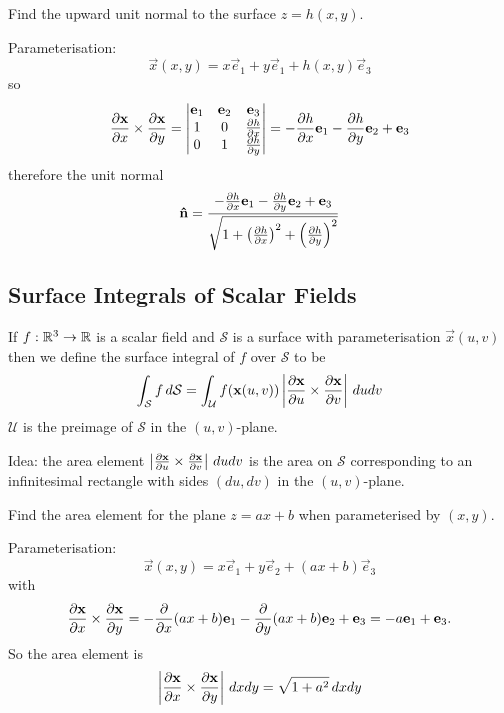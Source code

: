 \documentclass[10pt, a4paper]{article}
\begin{document}
\begin{example}
    Find the upward unit normal to the surface $z = h(x, y)$.

    \begin{solution}
        Parameterisation:
        \[
        \vec{x}(x, y) = x\vec{e}_1 + y\vec{e}_1 + h(x, y)\vec{e}_3
        \]
        so
        \[
        \pd[\vec{x}]{x} \times \pd[\vec{x}]{y} = \begin{vmatrix}
            \vec{e}_1 & \vec{e}_2 & \vec{e}_3 \\
            1 & 0 & \pd[h]{x} \\
            0 & 1 & \pd[h]{y}
        \end{vmatrix} = -\pd[h]{x}\vec{e}_1 - \pd[h]{y}\vec{e}_2 + \vec{e}_3
        \]
        therefore the unit normal
        \[
        \hvec{n} = \frac{-\pd[h]{x}\vec{e}_1 - \pd[h]{y}\vec{e}_2 + \vec{e}_3}{\sqrt{1 + \left(\pd[h]{x}\right) ^ 2 + \left(\pd[h]{y}\right) ^ 2}}
        \]
    \end{solution}
\end{example}

\subsection{Surface Integrals of Scalar Fields}
If $f : \R ^ 3 \to \R$ is a scalar field and $\mathcal{S}$ is a surface with parameterisation $\vec{x}(u, v)$ then we define the surface integral of $f$ over $\mathcal{S}$ to be
\[
\int_{\mathcal{S}}f\,d\mathcal{S} = \int_{\mathcal{U}}f(\vec{x}(u, v))\left|\pd[\vec{x}]{u} \times \pd[\vec{x}]{v}\right|\,dudv
\]
$\mathcal{U}$ is the preimage of $\mathcal{S}$ in the $(u, v)$-plane.

Idea:
the area element $\left|\pd[\vec{x}]{u} \times \pd[\vec{x}]{v}\right|\,dudv$ is the area on $\mathcal{S}$ corresponding to an infinitesimal rectangle with sides $(du, dv)$ in the $(u, v)$-plane.

\begin{example}
    Find the area element for the plane $z = ax + b$ when parameterised by $(x, y)$.

    \begin{solution}
        Parameterisation:
        \[
        \vec{x}(x, y) = x\vec{e}_1 + y\vec{e}_2 + (ax + b)\vec{e}_3
        \]
        with
        \[
        \pd[\vec{x}]{x} \times \pd[\vec{x}]{y} = -\pd{x}(ax + b)\vec{e}_1 - \pd{y}(ax + b)\vec{e}_2 + \vec{e}_3 = -a\vec{e}_1 + \vec{e}_3.
        \]
        So the area element is 
        \[
        \left|\pd[\vec{x}]{x} \times \pd[\vec{x}]{y}\right|\,dxdy = \sqrt{1 + a ^ 2}\,dxdy
        \]
    \end{solution}
\end{example}
\end{document}
